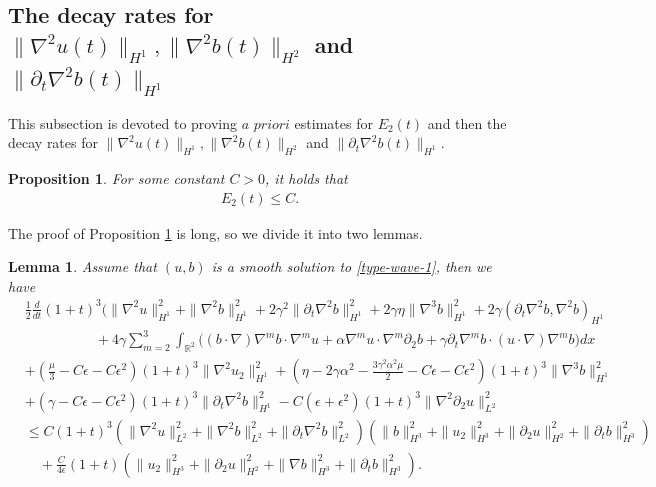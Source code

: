 \documentclass[reqno,11pt]{amsart}
\newtheorem{Prop}[Thm]{Proposition}
\newtheorem{Lem}[Thm]{Lemma}
\numberwithin{Thm}{section}
\begin{document}
\subsection{The decay rates for $\|\nabla^2 u(t)\|_{H^{1}},\|\nabla^2 b(t)\|_{H^{2}}$ and $
		\|\partial_t\nabla^2 b(t)\|_{H^{1}}$}
This subsection is devoted to proving $a$ $priori$ estimates for $E_2(t)$ and then the decay rates for $\|\nabla^2 u(t)\|_{H^{1}},\|\nabla^2 b(t)\|_{H^{2}}$ and $\|\partial_t\nabla^2 b(t)\|_{H^{1}}$.
\begin{Prop}\label{Prop2}
For some constant $C>0$, it holds that
\begin{align}\label{as3}
		E_2(t)
		\leq C.
\end{align}
\end{Prop}
The proof of Proposition \ref{Prop2} is long, so we divide it into two lemmas.
\begin{Lem}\label{keyy}
Assume that $(u,b)$ is a smooth solution to \eqref{type-wave-1}, then we have
\begin{align}\label{boundE}
&\frac{1}{2}\frac{d}{dt}(1+t)^3\Big(\|\nabla^2 u\|^2_{H^1}+\|\nabla^2 b\|^2_{H^1}+2\gamma^2\|\partial_t\nabla^2b\|^2_{H^1}
+2\gamma\eta\|\nabla^{3}b\|^2_{H^1}+2\gamma(\partial_t\nabla^2b,\nabla^2b)_{H^1}
\nonumber\\
&\qquad\qquad\quad+4\gamma\sum_{m=2}^3\int_{\mathbb{R}^2}
		\big((b\cdot\nabla)\nabla^m b\cdot\nabla^m u
		+\alpha\nabla^m u\cdot\nabla^m\partial_2 b
		+\gamma\partial_t\nabla^m b\cdot (u\cdot\nabla)\nabla^m b\big)dx\nonumber\\
&+(\frac{\mu}{3}-C\epsilon-C\epsilon^2)(1+t)^3\|\nabla^{2}u_2\|^2_{H^1}+(\eta-2\gamma\alpha^2-\frac{3\gamma^2\alpha^2\mu}{2}-C\epsilon-C\epsilon^2)(1+t)^3\|\nabla^{3}b\|^2_{H^1}\nonumber\\
&+(\gamma-C\epsilon-C\epsilon^2)(1+t)^3\|\partial_t\nabla^2b\|^2_{H^1}- C(\epsilon+\epsilon^2)(1+t)^3\|\nabla^2\partial_{2}u\|_{L^2}^2\nonumber\\
&\leq C(1+t)^3(\|\nabla^2 u\|_{L^2}^2+\|\nabla^2 b\|_{L^2}^2+\|\partial_t\nabla^2 b\|_{L^{2}}^2)(\|b\|_{H^3}^2+\| u_2\|_{H^3}^2+\| \partial_2u\|_{H^2}^2+\|\partial_t b\|_{H^3}^2)\nonumber\\
&\quad+\frac{C}{4\epsilon}(1+t)(\|u_2\|_{H^3}^2+\|\partial_2 u\|_{H^2}^2+\|\nabla b\|_{H^3}^2+\|\partial_t b\|_{H^3}^2).
\end{align}
\end{Lem}
\end{document}
